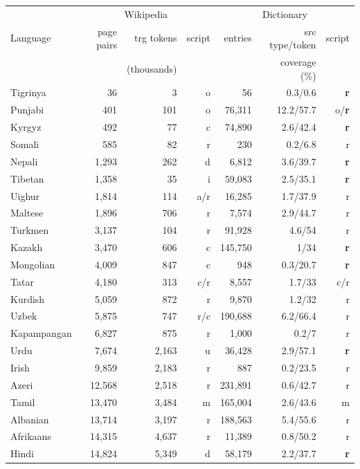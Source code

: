 \documentclass{article}
\begin{document}
\begin{table}[h!]
\setlength{\tabcolsep}{1ex}
\footnotesize
\begin{center}
\begin{tabular}{l|rrr|rrr|}
\multicolumn{1}{c}{}	&	\multicolumn{3}{c}{Wikipedia}	&	\multicolumn{3}{c}{Dictionary}\\
\cline{2-7}%
Language	& page pairs	&	trg tokens	&	script	&	entries	&	src type/token	&	script \\
	&	& (thousands)	&	&	&	coverage (\%) &\\
\hline
Tigrinya	&	36	&	3	&	o	&	56	&	0.3/0.6	&	{\bf r}\\
Punjabi 	&	401	&	101	&	o	&	76,311	&	12.2/57.7	&	o/{\bf r}\\ 	
Kyrgyz	&	492	&	77	&	c	&	74,890	&	2.6/42.4	&	{\bf r}\\
Somali 	&	585	&	82	&	r	&	230	&	0.2/6.8	&	r\\ 
Nepali 	&	1,293	&	262	&	d	&	6,812	&	3.6/39.7	&	{\bf r}\\
Tibetan	&	1,358	&	35	&	i	&	59,083	&	2.5/35.1	&	{\bf r}\\
Uighur	&	1,814	&	114	&	a/r	&	16,285	&	1.7/37.9	&	r\\
Maltese 	&	1,896	&	706	&	r	&	7,574	&	2.9/44.7	&	r\\
Turkmen	&	3,137	&	104	&	r	&	91,928	&	4.6/54	&	r\\
Kazakh 	&	3,470	&	606	&	c	&	145,750	&	1/34	&	{\bf r}\\
Mongolian 	&	4,009	&	847	&	c	&	948	&	0.3/20.7	&	{\bf r}\\
Tatar		&	4,180	&	313	&	c/r	&	 8,557	&	1.7/33	&	c/r\\
Kurdish	&	5,059	&	872	&	r	&	9,870	&	1.2/32	&	r\\
Uzbek 	&	5,875	&	747	&	r/c	&	190,688	&	6.2/66.4	&	r\\
Kapampangan	&	6,827	&	875	&	r	&	1,000	&	0.2/7	&	r\\
Urdu 	&	7,674	&	2,163	&	u	&	36,428	&	2.9/57.1	&	{\bf r}\\
Irish	&	9,859	&	2,183	&	r	&	887&	0.2/23.5	&	r\\
Azeri	&	12,568	&	2,518	&	r	&	231,891&	0.6/42.7	&	r\\
Tamil	&	13,470	&	3,484	&	m	&	165,004	&	2.6/43.6	&	m\\
Albanian 	&	13,714	&	3,197	&	r	&	188,563	&	5.4/55.6	&	r\\
Afrikaans	&	14,315	&	4,637	&	r	&	11,389	&	0.8/50.2	&	r\\
Hindi 	&	14,824	&	5,349	&	d	&	58,179	&	2.2/37.7	&	{\bf r}\\

\end{tabular}
\end{center}
\end{table}
\end{document}
